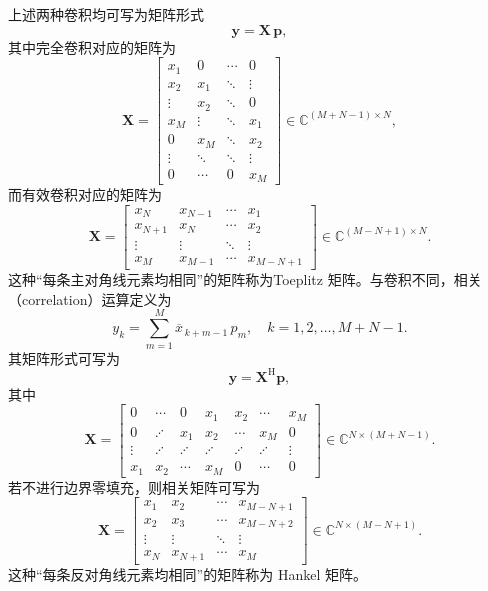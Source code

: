 上述两种卷积均可写为矩阵形式
\begin{equation}
    \bm{y} = \mathbf{X}\,\bm{p},
\end{equation}
其中完全卷积对应的矩阵为
\[
    \mathbf{X} =
    \begin{bmatrix}
        x_1    & 0      & \cdots & 0      \\
        x_2    & x_1    & \ddots & \vdots \\
        \vdots & x_2    & \ddots & 0      \\
        x_M    & \vdots & \ddots & x_1    \\
        0      & x_M    & \ddots & x_2    \\
        \vdots & \ddots & \ddots & \vdots \\
        0      & \cdots & 0      & x_M
    \end{bmatrix}
    \in \mathbb{C}^{(M+N-1)\times N},
\]
而有效卷积对应的矩阵为
\[
    \mathbf{X} =
    \begin{bmatrix}
        x_N     & x_{N-1} & \cdots & x_1       \\
        x_{N+1} & x_N     & \cdots & x_2       \\
        \vdots  & \vdots  & \ddots & \vdots    \\
        x_{M}   & x_{M-1} & \cdots & x_{M-N+1}
    \end{bmatrix}
    \in \mathbb{C}^{(M-N+1) \times N}.
\]
这种``每条主对角线元素均相同''的矩阵称为Toeplitz 矩阵。与卷积不同，相关（correlation）运算定义为
\begin{equation}
    y_k = \sum_{m=1}^{M} \overline{x}_{\,k+m-1}\, p_m,
    \quad k = 1,2,\ldots, M+N-1.
\end{equation}
其矩阵形式可写为
\begin{equation}
    \bm{y} = \mathbf{X}^{\mathrm{H}} \bm{p},
\end{equation}
其中
\[
    \mathbf{X} =
    \begin{bmatrix}
        0      & \cdots  & 0       & x_1     & x_2     & \cdots  & x_M    \\
        0      & \iddots & x_1     & x_2     & \cdots  & x_M     & 0      \\
        \vdots & \iddots & \iddots & \iddots & \iddots & \iddots & \vdots \\
        x_1    & x_2     & \cdots  & x_M     & 0       & \cdots  & 0
    \end{bmatrix}
    \in \mathbb{C}^{N \times (M+N-1)}.
\]
若不进行边界零填充，则相关矩阵可写为
\[
    \mathbf{X} =
    \begin{bmatrix}
        x_1    & x_2     & \cdots & x_{M-N+1} \\
        x_2    & x_3     & \cdots & x_{M-N+2} \\
        \vdots & \vdots  & \ddots & \vdots    \\
        x_N    & x_{N+1} & \cdots & x_M
    \end{bmatrix}
    \in \mathbb{C}^{N \times (M-N+1)}.
\]
这种``每条反对角线元素均相同''的矩阵称为 Hankel 矩阵。

